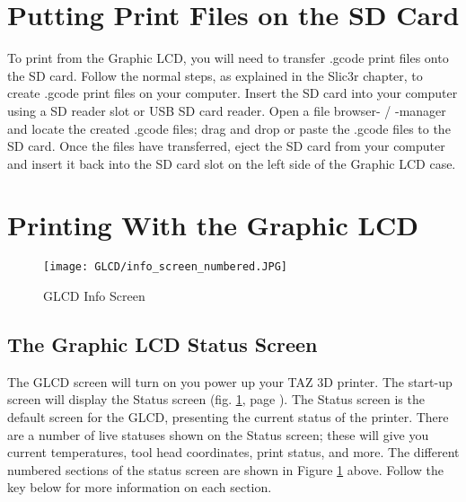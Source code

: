 \section{Putting Print Files on the SD Card}
To print from the Graphic LCD, you will need to transfer .gcode print files onto the SD card. Follow the normal steps, as explained in the Slic3r chapter, to create .gcode print files on your computer. Insert the SD card into your computer using a SD reader slot or USB SD card reader. Open a file browser- / -manager and locate the created .gcode files; drag and drop or paste the .gcode files to the SD card. Once the files have transferred, eject the SD card from your computer and insert it back into the SD card slot on the left side of the Graphic LCD case.

\section{Printing With the Graphic LCD}
\begin{figure}[b]
\centering
\texttt{[image: GLCD/info\_screen\_numbered.JPG]}
\caption{GLCD Info Screen}
\label{fig:info_screen}
\end{figure}

\subsection{The Graphic LCD Status Screen}
The GLCD screen will turn on you power up your TAZ 3D printer. The start-up screen will display the Status screen (fig. \ref{fig:info_screen}, page \pageref{fig:info_screen}). The Status screen is the default screen for the GLCD, presenting the current status of the printer. There are a number of live statuses shown on the Status screen; these will give you current temperatures, tool head coordinates, print status, and more. The different numbered sections of the status screen are shown in Figure \ref{fig:info_screen} above. Follow the key below for more information on each section.

